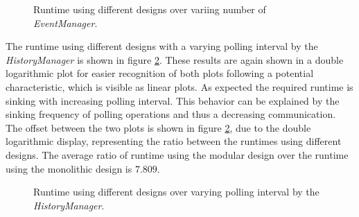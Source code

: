 \begin{figure}
    \centering
    \caption{Runtime using different designs over variing number of \emph{EventManager}.}
    \label{fig:results_runtime_eventmanager}
\end{figure}

The runtime using different designs with a varying polling interval by the \emph{HistoryManager} is shown in figure \ref{fig:results_runtime_polling}.
These results are again shown in a double logarithmic plot for easier recognition of both plots following a potential characteristic, which is visible as linear plots.
As expected the required runtime is sinking with increasing polling interval.
This behavior can be explained by the sinking frequency of polling operations and thus a decreasing communication.
The offset between the two plots is shown in figure \ref{fig:results_runtime_polling}, due to the double logarithmic display, representing the ratio between the runtimes using different designs.
The average ratio of runtime using the modular design over the runtime using the monolithic design is $7.809$.
\\
\begin{figure}
    \centering
    \caption{Runtime using different designs over varying polling interval by the \emph{HistoryManager}.}
    \label{fig:results_runtime_polling}
\end{figure}

